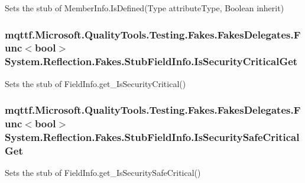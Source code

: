 Sets the stub of Member\-Info.\-Is\-Defined(\-Type attribute\-Type, Boolean inherit)

\hypertarget{class_system_1_1_reflection_1_1_fakes_1_1_stub_field_info_a8a85039a5c3dfcf93a7befa778d98794}{
\subsubsection[{Is\-Security\-Critical\-Get}]{\setlength{\rightskip}{0pt plus 5cm}mqttf.\-Microsoft.\-Quality\-Tools.\-Testing.\-Fakes.\-Fakes\-Delegates.\-Func$<$bool$>$ System.\-Reflection.\-Fakes.\-Stub\-Field\-Info.\-Is\-Security\-Critical\-Get}}\label{class_system_1_1_reflection_1_1_fakes_1_1_stub_field_info_a8a85039a5c3dfcf93a7befa778d98794}


Sets the stub of Field\-Info.\-get\-\_\-\-Is\-Security\-Critical()

\hypertarget{class_system_1_1_reflection_1_1_fakes_1_1_stub_field_info_a21aa3c733188ed0331d2039345e1f6c5}{
\subsubsection[{Is\-Security\-Safe\-Critical\-Get}]{\setlength{\rightskip}{0pt plus 5cm}mqttf.\-Microsoft.\-Quality\-Tools.\-Testing.\-Fakes.\-Fakes\-Delegates.\-Func$<$bool$>$ System.\-Reflection.\-Fakes.\-Stub\-Field\-Info.\-Is\-Security\-Safe\-Critical\-Get}}\label{class_system_1_1_reflection_1_1_fakes_1_1_stub_field_info_a21aa3c733188ed0331d2039345e1f6c5}


Sets the stub of Field\-Info.\-get\-\_\-\-Is\-Security\-Safe\-Critical()

